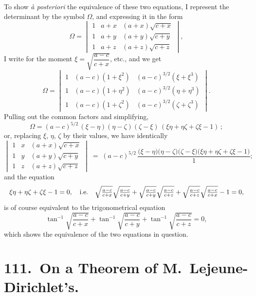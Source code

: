 \documentclass[11pt,a4paper]{article}
\theoremstyle{plain}
\begin{document}
To show \emph{\`a posteriori} the equivalence of these two equations, I represent the determinant by the symbol $\Omega$, and expressing it in the form
\[\Omega = \begin{vmatrix} 1 & a+x & (a+x)\sqrt{c+x} \\ 1 & a+y & (a+y)\sqrt{c+y} \\ 1 & a+z & (a+z)\sqrt{c+z} \end{vmatrix},\]
I write for the moment $\xi = \sqrt{\dfrac{a-c}{c+x}}$, etc., and we get
\[\Omega = \begin{vmatrix} 1 & (a-c)(1+\xi^2) & (a-c)^{3/2}(\xi+\xi^3) \\ 1 & (a-c)(1+\eta^2) & (a-c)^{3/2}(\eta+\eta^3) \\ 1 & (a-c)(1+\zeta^2) & (a-c)^{3/2}(\zeta+\zeta^3) \end{vmatrix}.\]
Pulling out the common factors and simplifying,
\[\Omega = (a-c)^{5/2}\,(\xi-\eta)(\eta-\zeta)(\zeta-\xi)\,(\xi\eta + \eta\zeta + \zeta\xi - 1)\,;\]
or, replacing $\xi$, $\eta$, $\zeta$ by their values, we have identically
\[
\begin{vmatrix}
1 & x & (a+x)\sqrt{c+x} \\
1 & y & (a+y)\sqrt{c+y} \\
1 & z & (a+z)\sqrt{c+z}
\end{vmatrix} \;=\; (a-c)^{5/2}\, \frac{\bigl(\xi-\eta\bigr)\bigl(\eta-\zeta\bigr)\bigl(\zeta-\xi\bigr)\bigl(\xi\eta+\eta\zeta+\zeta\xi-1\bigr)}{1};
\]
and the equation
\[
\resizebox{\textwidth}{!}{$\displaystyle \xi\eta + \eta\zeta + \zeta\xi - 1 = 0,\quad\text{i.e.}\quad \sqrt{\tfrac{a-c}{c+x}}\sqrt{\tfrac{a-c}{c+y}} + \sqrt{\tfrac{a-c}{c+y}}\sqrt{\tfrac{a-c}{c+z}} + \sqrt{\tfrac{a-c}{c+z}}\sqrt{\tfrac{a-c}{c+x}} - 1 = 0, $}
\]
is of course equivalent to the trigonometrical equation
\[\tan^{-1}\sqrt{\frac{a-c}{c+x}} + \tan^{-1}\sqrt{\frac{a-c}{c+y}} + \tan^{-1}\sqrt{\frac{a-c}{c+z}} = 0,\]
which shows the equivalence of the two equations in question.
\clearpage


\section*{111.\ On a Theorem of M.\ Lejeune-Dirichlet's.}
\end{document}
